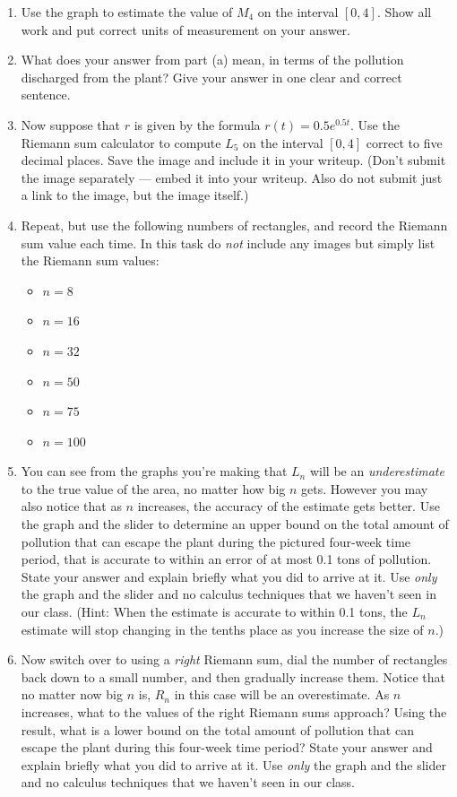 \documentclass[11pt,letterpaper]{article}
\begin{document}
\begin{enumerate}
	\item Use the graph to estimate the value of $M_4$ on the interval $[0,4]$. Show all work and put correct units of measurement on your answer. 

	\item What does your answer from part (a) mean, in terms of the pollution discharged from the plant? Give your answer in one clear and correct sentence. 

	\item Now suppose that $r$ is given by the formula $r(t) = 0.5e^{0.5t}$. Use the Riemann sum calculator to compute $L_5$ on the interval $[0,4]$ correct to five decimal places. Save the image and include it in your writeup. (Don't submit the image separately --- embed it into your writeup. Also do not submit just a link to the image, but the image itself.) 

	\item Repeat, but use the following numbers of rectangles, and record the Riemann sum value each time. In this task do \emph{not} include any images but simply list the Riemann sum values: 
	\begin{itemize}
	    \item $n = 8$
	    \item $n = 16$
	    \item $n = 32$ 
	    \item $n = 50$
	    \item $n = 75$
	    \item $n = 100$
	\end{itemize}


	\item You can see from the graphs you're making that $L_n$ will be an \emph{underestimate} to the true value of the area, no matter how big $n$ gets. However you may also notice that as $n$ increases, the accuracy of the estimate gets better. Use the graph and the slider to determine an upper bound on the total amount of pollution that can escape the plant during the pictured four-week time period, that is accurate to within an error of at most 0.1 tons of pollution. State your answer and explain briefly what you did to arrive at it. Use \emph{only} the graph and the slider and no calculus techniques that we haven't seen in our class. (Hint: When the estimate is accurate to within 0.1 tons, the $L_n$ estimate will stop changing in the tenths place as you increase the size of $n$.)
	
	\item Now switch over to using a \emph{right} Riemann sum, dial the number of rectangles back down to a small number, and then gradually increase them. Notice that no matter now big $n$ is, $R_n$ in this case will be an overestimate. As $n$ increases, what to the values of the right Riemann sums approach? Using the result, what is a lower bound on the total amount of pollution that can escape the plant during this four-week time period? State your answer and explain briefly what you did to arrive at it. Use \emph{only} the graph and the slider and no calculus techniques that we haven't seen in our class.
	

\end{enumerate}
\end{document}
